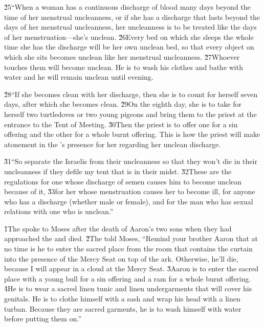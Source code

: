 \v{25}``When a woman has a continuous discharge of blood many days beyond the time of her menstrual uncleanness, or if she has a discharge that lasts beyond the days of her menstrual uncleanness, her uncleanness is to be treated like the days of her menstruation---she's unclean. \v{26}Every bed on which she sleeps the whole time she has the discharge will be her own unclean bed, so that every object on which she sits becomes unclean like her menstrual uncleanness. \v{27}Whoever touches them will become unclean. He is to wash his clothes and bathe with water and he will remain unclean until evening.

\v{28}``If she becomes clean with her discharge, then she is to count for herself seven days, after which she becomes clean. \v{29}On the eighth day, she is to take for herself two turtledoves or two young pigeons and bring them to the priest at the entrance to the Tent of Meeting. \v{30}Then the priest is to offer one for a sin offering and the other for a whole burnt offering. This is how the priest will make atonement in the 's presence for her regarding her unclean discharge.

\v{31}``So separate the Israelis from their uncleanness so that they won't die in their uncleanness if they defile my tent that is in their midst. \v{32}These are the regulations for one whose discharge of semen causes him to become unclean because of it, \v{33}for her whose menstruation causes her to become ill, for anyone who has a discharge (whether male or female), and for the man who has sexual relations with one who is unclean.''

\v{1}The  spoke to Moses after the death of Aaron's two sons when they had approached the  and died. \v{2}The  told Moses, ``Remind your brother Aaron that at no time is he to enter the sacred place from the room that contains the curtain into the presence of the Mercy Seat on top of the ark. Otherwise, he'll die, because I will appear in a cloud at the Mercy Seat. \v{3}Aaron is to enter the sacred place with a young bull for a sin offering and a ram for a whole burnt offering. \v{4}He is to wear a sacred linen tunic and linen undergarments that will cover his genitals. He is to clothe himself with a sash and wrap his head with a linen turban. Because they are sacred garments, he is to wash himself with water before putting them on.''

